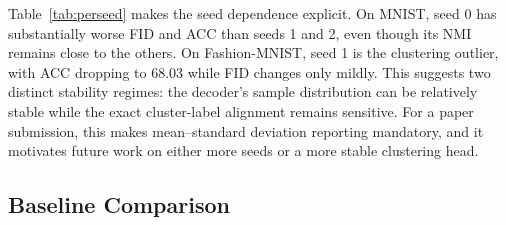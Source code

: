 \documentclass[10pt]{article}
\begin{document}
\begin{table}[t]
\centering
\caption{Per-seed CS-WAE results. ACC, NMI, and ARI are percentages. Seed-level reporting is important because clustering accuracy varies more than NMI and reconstruction metrics.}
\label{tab:perseed}
\end{table}

Table~\ref{tab:perseed} makes the seed dependence explicit. On MNIST, seed 0 has substantially worse FID and ACC than seeds 1 and 2, even though its NMI remains close to the others. On Fashion-MNIST, seed 1 is the clustering outlier, with ACC dropping to 68.03 while FID changes only mildly. This suggests two distinct stability regimes: the decoder's sample distribution can be relatively stable while the exact cluster-label alignment remains sensitive. For a paper submission, this makes mean--standard deviation reporting mandatory, and it motivates future work on either more seeds or a more stable clustering head.

\subsection{Baseline Comparison}
\end{document}
